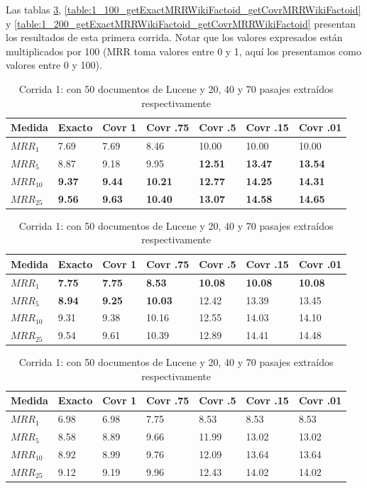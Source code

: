 Las tablas \ref{table:1_50_getExactMRRWikiFactoid_getCovrMRRWikiFactoid}, \ref{table:1_100_getExactMRRWikiFactoid_getCovrMRRWikiFactoid} y \ref{table:1_200_getExactMRRWikiFactoid_getCovrMRRWikiFactoid} presentan los resultados de esta primera corrida. Notar que los valores expresados están multiplicados por 100 (MRR toma valores entre 0 y 1, aquí los presentamos como valores entre 0 y 100).

\begin{table}
\centering
\begin{center}
\begin{tabular}{|l | l | l | l | l | l | l |}
\hline
Medida & Exacto & Covr 1 & Covr .75 & Covr .5 & Covr .15 & Covr .01 \\ \hline
$MRR_{1}$ & 7.69 & 7.69 & 8.46 & 10.00 & 10.00 & 10.00  \\ \hline
$MRR_{5}$ & 8.87 & 9.18 & 9.95 & \textbf{12.51} & \textbf{13.47} & \textbf{13.54}  \\ \hline
$MRR_{10}$ & \textbf{9.37} & \textbf{9.44} & \textbf{10.21} & \textbf{12.77} & \textbf{14.25} & \textbf{14.31}  \\ \hline
$MRR_{25}$ & \textbf{9.56} & \textbf{9.63} & \textbf{10.40} & \textbf{13.07} & \textbf{14.58} & \textbf{14.65}  \\ \hline
\end{tabular}

\medskip

\begin{tabular}{|l | l | l | l | l | l | l |}
\hline
Medida & Exacto & Covr 1 & Covr .75 & Covr .5 & Covr .15 & Covr .01 \\ \hline
$MRR_{1}$ & \textbf{7.75} & \textbf{7.75} & \textbf{8.53} & \textbf{10.08} & \textbf{10.08} & \textbf{10.08}  \\ \hline
$MRR_{5}$ & \textbf{8.94} & \textbf{9.25} & \textbf{10.03} & 12.42 & 13.39 & 13.45  \\ \hline
$MRR_{10}$ & 9.31 & 9.38 & 10.16 & 12.55 & 14.03 & 14.10  \\ \hline
$MRR_{25}$ & 9.54 & 9.61 & 10.39 & 12.89 & 14.41 & 14.48  \\ \hline
\end{tabular}

\medskip

\begin{tabular}{|l | l | l | l | l | l | l |}
\hline
Medida & Exacto & Covr 1 & Covr .75 & Covr .5 & Covr .15 & Covr .01 \\ \hline
$MRR_{1}$ & 6.98 & 6.98 & 7.75 & 8.53 & 8.53 & 8.53  \\ \hline
$MRR_{5}$ & 8.58 & 8.89 & 9.66 & 11.99 & 13.02 & 13.02  \\ \hline
$MRR_{10}$ & 8.92 & 8.99 & 9.76 & 12.09 & 13.64 & 13.64  \\ \hline
$MRR_{25}$ & 9.12 & 9.19 & 9.96 & 12.43 & 14.02 & 14.02  \\ \hline
\end{tabular}

\caption{Corrida 1: con 50 documentos de Lucene y 20, 40 y 70 pasajes extraídos respectivamente}
\label{table:1_50_getExactMRRWikiFactoid_getCovrMRRWikiFactoid}
\end{center}
\end{table}


